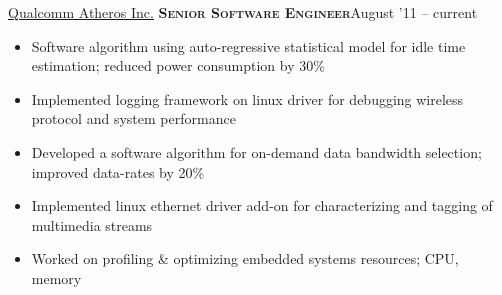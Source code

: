 \documentclass[10pt,a4paper]{article} %
\begin{document}
\vspace{-0.65em}
\headedsection %
{\href{http://www.qca.qualcomm.com}{Qualcomm Atheros Inc.}}
{\textsc{\textbf{Senior Software Engineer}}}{August '11 -- current}
\vspace{-1.0em}
\vspace{-0.2em}
\bodytext
  {\begin{itemize}
	\item Software algorithm using auto-regressive statistical model for idle time estimation; reduced power consumption by 30\% 
	\item Implemented logging framework on linux driver for debugging wireless protocol and system performance
	\item Developed a software algorithm for on-demand data bandwidth selection; improved data-rates by 20\%
	\item Implemented linux ethernet driver add-on for characterizing and tagging of multimedia streams%
	\item Worked on profiling \& optimizing embedded systems resources; CPU, memory
\end{itemize}}

%
\end{document}
